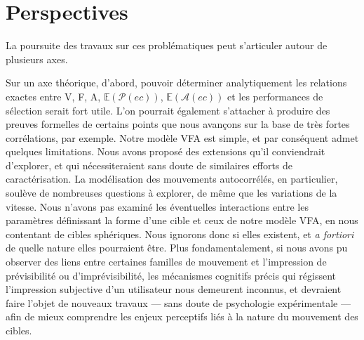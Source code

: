 	\section*{Perspectives}
	La poursuite des travaux sur ces problématiques peut s'articuler autour de plusieurs axes.
	
	Sur un axe théorique, d'abord, pouvoir déterminer analytiquement les relations exactes entre V, F, A, $\mathbb{E}(\mathcal{P}(ec))$, $\mathbb{E}(\mathcal{A}(ec))$ et les performances de sélection serait fort utile. L'on pourrait également s'attacher à produire des preuves formelles de certains points que nous avançons sur la base de très fortes corrélations, par exemple. Notre modèle VFA est simple, et par conséquent admet quelques limitations. Nous avons proposé des extensions qu'il conviendrait d'explorer, et qui nécessiteraient sans doute de similaires efforts de caractérisation. La modélisation des mouvements autocorrélés, en particulier, soulève de nombreuses questions à explorer, de même que les variations de la vitesse. Nous n'avons pas examiné les éventuelles interactions entre les paramètres définissant la forme d'une cible et ceux de notre modèle VFA, en nous contentant de cibles sphériques. Nous ignorons donc si elles existent, et \emph{a fortiori} de quelle nature elles pourraient être. Plus fondamentalement, si nous avons pu observer des liens entre certaines familles de mouvement et l'impression de prévisibilité ou d'imprévisibilité, les mécanismes cognitifs précis qui régissent l'impression subjective d'un utilisateur nous demeurent inconnus, et devraient faire l'objet de nouveaux travaux --- sans doute de psychologie expérimentale --- afin de mieux comprendre les enjeux perceptifs liés à la nature du mouvement des cibles.
	
